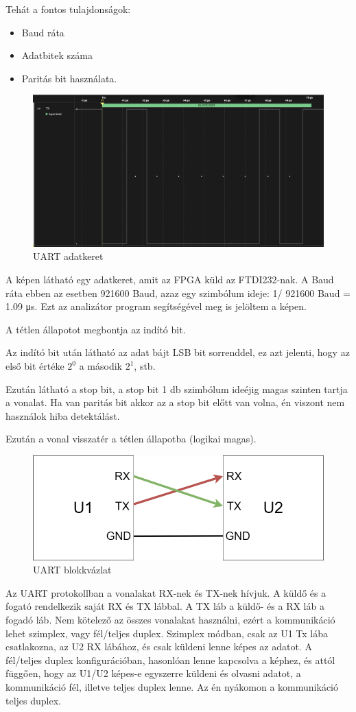 \documentclass[a4paper,12pt,oneside]{book}
\begin{document}
Tehát a fontos tulajdonságok:
\begin{itemize}
	\item Baud ráta
	\item Adatbitek száma 
	\item Paritás bit használata.
\end{itemize}
\begin{figure}[H]
	\centering
	\includegraphics[trim=1mm 1mm 1mm 1mm,scale=0.35]{UARTfromAnalyzer.PNG}
	\caption{UART adatkeret}
	\label{UARTkep}
\end{figure}
A képen látható egy adatkeret, amit az FPGA küld az FTDI232-nak. A Baud ráta ebben az esetben 921600 Baud, azaz egy szimbólum ideje: 1/ 921600 Baud = 1.09 μs. Ezt az analizátor program segítségével meg is jelöltem a képen.

A tétlen állapotot megbontja az indító bit.

Az indító bit után látható az adat bájt LSB bit sorrenddel, ez azt jelenti, hogy az első bit értéke $2^0$ a második $2^1$, stb. 

Ezután látható a stop bit, a stop bit 1 db szimbólum ideéjig magas szinten tartja a vonalat. Ha van paritás bit akkor az a stop bit előtt van volna, én viszont nem használok hiba detektálást.

Ezután a vonal visszatér a tétlen állapotba (logikai magas).
\begin{figure}[H]
	\centering
	\includegraphics[trim=1mm 1mm 1mm 1mm,scale=0.55]{uartblock.png}
	\caption{UART blokkvázlat}
	\label{UARTblockk}
\end{figure}
Az UART protokollban a vonalakat RX-nek és TX-nek hívjuk. A küldő és a fogató rendelkezik saját RX és TX lábbal. A TX láb a küldő- és a RX láb a fogadó láb. Nem kötelező az összes vonalakat használni, ezért a kommunikáció lehet szimplex, vagy fél/teljes duplex. Szimplex módban, csak az U1 Tx lába csatlakozna, az U2 RX lábához, és csak küldeni lenne képes az adatot. A fél/teljes duplex konfigurációban, hasonlóan lenne kapcsolva a képhez, és attól függően, hogy az U1/U2 képes-e egyszerre küldeni és olvasni adatot, a kommunikáció fél, illetve teljes duplex lenne. Az én nyákomon a kommunikáció teljes duplex.
\end{document}

